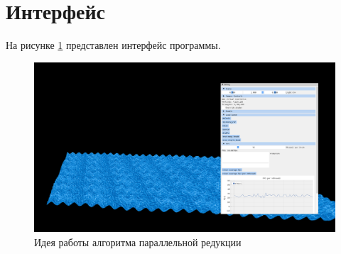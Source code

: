 \section{Интерфейс}

На рисунке \ref{img:program_interface_basic} представлен интерфейс программы.

\begin{figure}[H]
	\begin{center}
		\includegraphics[scale=0.3]{img/interface.png}
	\end{center}
	\captionsetup{justification=centering}
	\caption{Идея работы алгоритма параллельной редукции}
	\label{img:program_interface_basic}
\end{figure}

